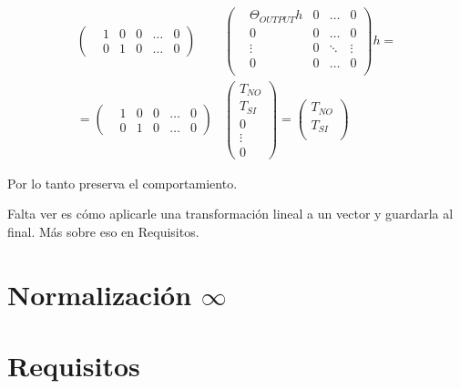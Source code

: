 \documentclass{article}
\begin{document}
\begin{align*}
    \left(\begin{matrix}
        &1 &0 &0 &\dots &0 \\
        &0 &1 &0 &\dots &0 
    \end{matrix}\right)
    &\left(\begin{matrix}
        &\Theta_{OUTPUT}h &0 &\dots  &0 \\
        &0                &0 &\dots  &0 \\
        &\vdots           &0 &\ddots &\vdots \\
        &0                &0 &\dots  &0 \\
    \end{matrix}\right)h = \\
    = \left(\begin{matrix}
        &1 &0 &0 &\dots &0 \\
        &0 &1 &0 &\dots &0 
    \end{matrix}\right)
    &\left(\begin{matrix}
        T_{NO} \\
        T_{SI} \\ 
        0 \\
        \vdots \\
        0
    \end{matrix}\right) = 
    \left(\begin{matrix}
        T_{NO} \\
        T_{SI} \\ 
    \end{matrix}\right)
\end{align*}

Por lo tanto preserva el comportamiento.

Falta ver es cómo aplicarle una transformación lineal a un vector y guardarla al final. Más sobre eso en Requisitos.

\section*{Normalización $\infty$}


\section*{Requisitos}
\end{document}
